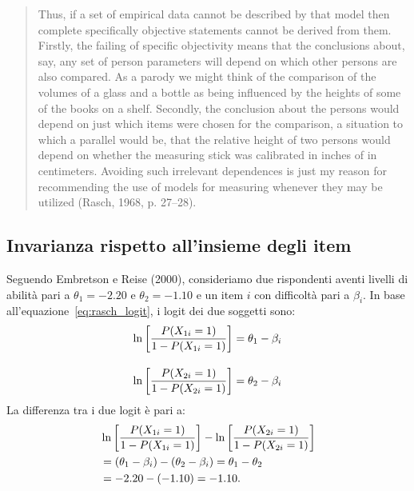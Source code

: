 \begin{quote}
Thus, if a set of empirical data cannot be described by that model then complete specifically objective statements cannot be derived from them.  Firstly, the failing of specific objectivity means that the conclusions about, say, any set of person parameters will depend on which other persons are also compared.  As a parody we might think of the comparison of the volumes of a glass and a bottle as being influenced by the heights of some of the books on a shelf. Secondly, the conclusion about the persons would depend on just which items were chosen for the comparison, a situation to which a parallel would be, that the relative height of two persons would depend on whether the measuring stick was calibrated in inches of in centimeters. Avoiding such irrelevant dependences is just my reason for recommending the use of models for measuring whenever they may be utilized  (Rasch, 1968, p. 27--28).
\end{quote}

\subsection{Invarianza rispetto all'insieme degli item}



Seguendo Embretson e Reise (2000), consideriamo due rispondenti aventi livelli di abilità pari a $\theta_1=-2.20$ e  $\theta_2=-1.10$ e un item $i$ con  difficoltà pari a $\beta_i$. In base all'equazione~\ref{eq:rasch_logit}, i logit dei due soggetti sono:
\begin{align}
\ln \left[\frac{P(X_{1i}=1)}{1-P(X_{1i}=1)}\right] &= \theta_1-\beta_i\notag\\[10pt]
\ln \left[\frac{P(X_{2i}=1)}{1-P(X_{2i}=1)}\right] &= \theta_2-\beta_i\notag
\end{align}
La differenza tra i due logit è pari a:
\begin{align}
&\ln \left[\frac{P(X_{1i}=1)}{1-P(X_{1i}=1)}\right] - \ln \left[ \frac{P(X_{2i}=1)}{1-P(X_{2i}=1)} \right]\notag\\ 
 &=(\theta_1-\beta_i)-(\theta_2-\beta_i)
=\theta_1-\theta_2\notag\\ 
&=-2.20-(-1.10)=-1.10. \notag
\end{align}

